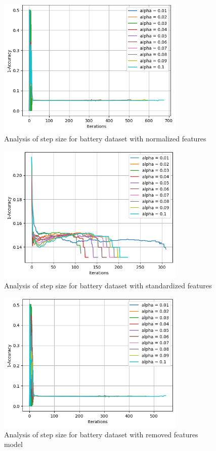\documentclass{article}
\begin{document}
\begin{figure}[H]
  \centering
  \includegraphics[width=0.8\textwidth]{Batmodel1.png}
  \caption{Analysis of step size for battery dataset with normalized features}
  \label{fig:quad_battery}
\end{figure}

\begin{figure}[H]
  \centering
  \includegraphics[width=0.8\textwidth]{Batmodel2.png}
  \caption{Analysis of step size for battery dataset with standardized features}
  \label{fig:quad_battery}
\end{figure}

\begin{figure}[H]
  \centering
  \includegraphics[width=0.8\textwidth]{Batmodel3.png}
  \caption{Analysis of step size for battery dataset with removed features model}
  \label{fig:quad_battery}
\end{figure}
\end{document}
